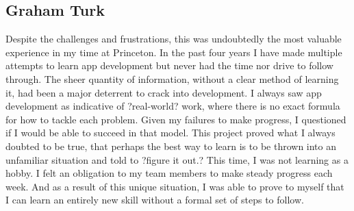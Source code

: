 \documentclass[12pt]{article}
\begin{document}
\subsection{Graham Turk}

Despite the challenges and frustrations, this was undoubtedly the most valuable experience in my time at Princeton. In the past four years I have made multiple attempts to learn app development but never had the time nor drive to follow through. The sheer quantity of information, without a clear method of learning it, had been a major deterrent to crack into development. I always saw app development as indicative of ?real-world? work, where there is no exact formula for how to tackle each problem. Given my failures to make progress, I questioned if I would be able to succeed in that model. This project proved what I always doubted to be true, that perhaps the best way to learn is to be thrown into an unfamiliar situation and told to ?figure it out.? This time, I was not learning as a hobby. I felt an obligation to my team members to make steady progress each week. And as a result of this unique situation, I was able to prove to myself that I can learn an entirely new skill without a formal set of steps to follow. 
\end{document}
